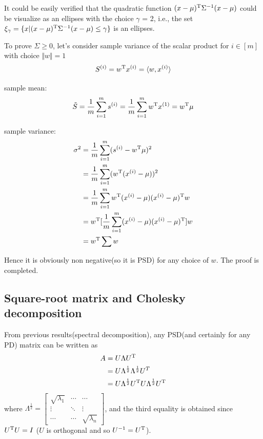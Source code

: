 It could be easily verified that the quadratic function $(x - \mu)^{{\rm T}} \Sigma^{-1}(x - \mu)$ could be visualize as an ellipses with the choice $\gamma$ = 2, i.e., the set $\xi_{\gamma} = \{x | (x - \mu)^{{\rm T}} \Sigma^{-1}(x - \mu)\leq \gamma \}$ is an ellipses.


To prove $\Sigma\geq 0$, let's consider sample variance of the scalar product for $i\in [m]$ with choice $\Vert w\Vert=1$
$$S^{(i)} =w^{{\rm T}}x^{(i)} =\langle w, x^{(i)}\rangle$$

sample mean:
$$\tilde{S} = \frac{1}{m}\sum^m_{i=1}s^{(i)} = \frac{1}{m}\sum^m_{i=1}w^{{\rm T}}x^{(1)} = w^{{\rm T}}\mu$$

sample variance: 
\begin{align*}
\sigma^2 &= \frac{1}{m}\sum^m_{i=1}(s^{(i)} - w^{{\rm T}}\mu)^2 \\
&= \frac{1}{m}\sum^m_{i=1}(w^{{\rm T}}(x^{(i)} -\mu))^2\\
&=\frac{1}{m}\sum^m_{i=1}w^{{\rm T}}(x^{(i)}-\mu)(x^{(i)}-\mu)^{{\rm T}}w\\
&= w^{{\rm T}}[\frac{1}{m}\sum^m_{i=1}(x^{(i)}-\mu)(x^{(i)}-\mu)^{{\rm T}}]w\\
&= w^{{\rm T}}\sum w
\end{align*}

Hence it is obviously non negative(so it is PSD) for any choice of $w$. The proof is completed.


\subsection{Square-root matrix and Cholesky decomposition}

From previous results(spectral decomposition), any PSD(and certainly for any PD) matrix can be written as
\begin{align*}
A &= U\Lambda U^{{\rm T}} \\
&=U\Lambda^{\frac{1}{2}}\Lambda^{\frac{1}{2}}U^{T}\\
&= U\Lambda^{\frac{1}{2}}U^{{\rm T}}U\Lambda^{\frac{1}{2}}U^{{\rm T}}
\end{align*}
where $\Lambda^{\frac{1}{2}}=
\begin{bmatrix}%
	\sqrt{\lambda_1}&\cdots&\cdots\\
	\vdots&\ddots&\vdots\\
	\cdots&\cdots&\sqrt{\lambda_n}
\end{bmatrix}$,
and the third equality is obtained since $U^{{\rm T}}U=I$ ($U$ is orthogonal and so $U^{-1}=U^{{\rm T}}$).


